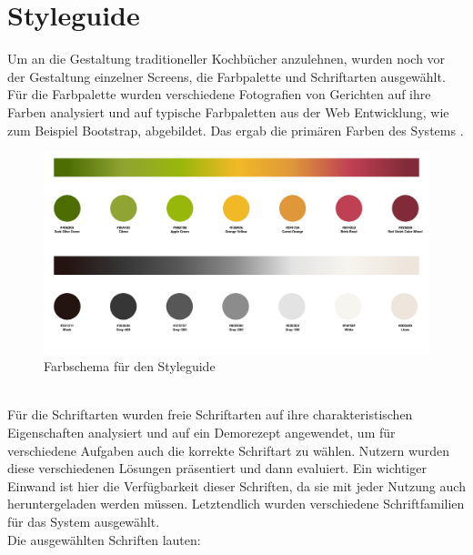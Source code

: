 \section{Styleguide}
\label{subsec:styleguide}
Um an die Gestaltung traditioneller Kochbücher anzulehnen, wurden noch vor der Gestaltung einzelner Screens, die Farbpalette und Schriftarten ausgewählt. Für die Farbpalette wurden verschiedene Fotografien von Gerichten auf ihre Farben analysiert und auf typische Farbpaletten aus der Web Entwicklung, wie zum Beispiel Bootstrap, abgebildet. Das ergab die primären Farben des Systems \citep{colortheme_2019}.  \\
\begin{figure}[h] %
    \includegraphics[width=1\textwidth]{images/colorscheme.png}
    \caption[Farbschema für den Styleguide]{Farbschema für den Styleguide}
    \label{fig:styleguide-colorscheme}
\end{figure}
\\
Für die Schriftarten wurden freie Schriftarten auf ihre charakteristischen Eigenschaften analysiert und auf ein Demorezept angewendet, um für verschiedene Aufgaben auch die korrekte Schriftart zu wählen. Nutzern wurden diese verschiedenen Lösungen präsentiert und dann evaluiert. Ein wichtiger Einwand ist hier die Verfügbarkeit dieser Schriften, da sie mit jeder Nutzung auch heruntergeladen werden müssen. Letztendlich wurden verschiedene Schriftfamilien für das System ausgewählt. \\
Die ausgewählten Schriften lauten: \\
